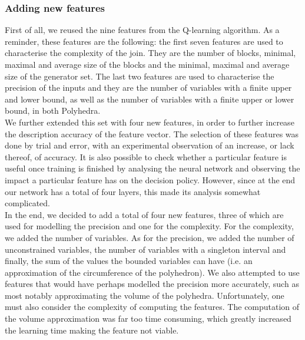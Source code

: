 \subsubsection{Adding new features}
First of all, we reused the nine features from the Q-learning algorithm. As a reminder, these features are the following: the first seven features are used to characterise the complexity of the join. They are the number of blocks, minimal, maximal and average size of the blocks and the minimal, maximal and average size of the generator set. The last two features are used to characterise the precision of the inputs and they are the number of variables with a finite upper and lower bound, as well as the number of variables with a finite upper or lower bound, in both Polyhedra.\\
We further extended this set with four new features, in order to further increase the description accuracy of the feature vector. The selection of these features was done by trial and error, with an experimental observation of an increase, or lack thereof, of accuracy. It is also possible to check whether a particular feature is useful once training is finished by analysing the neural network and observing the impact a particular feature has on the decision policy. However, since at the end our network has a total of four layers, this made its analysis somewhat complicated.\\
In the end, we decided to add a total of four new features, three of which are used for modelling the precision and one for the complexity. For the complexity, we added the number of variables. As for the precision, we added the number of unconstrained variables, the number of variables with a singleton interval and finally, the sum of the values the bounded variables can have (i.e. an approximation of the circumference of the polyhedron). We also attempted to use features that would have perhaps modelled the precision more accurately, such as most notably approximating the volume of the polyhedra. Unfortunately, one must also consider the complexity of computing the features. The computation of the volume approximation was far too time consuming, which greatly increased the learning time making the feature not viable.
